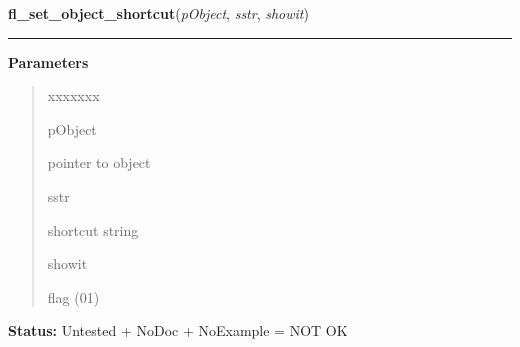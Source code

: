 \hspace{.8\funcindent}\begin{boxedminipage}{\funcwidth}

    \raggedright \textbf{fl\_set\_object\_shortcut}(\textit{pObject}, \textit{sstr}, \textit{showit})

    \vspace{-1.5ex}

    \rule{\textwidth}{0.5\fboxrule}
\setlength{\parskip}{2ex}
\setlength{\parskip}{1ex}
      \textbf{Parameters}
      \vspace{-1ex}

      \begin{quote}
        \begin{Ventry}{xxxxxxx}

          \item[pObject]

          pointer to object

          \item[sstr]

          shortcut string

          \item[showit]

          flag (0{\textbar}1)

        \end{Ventry}

      \end{quote}

\textbf{Status:} Untested + NoDoc + NoExample = NOT OK



    \end{boxedminipage}

    \label{xformslib:library:fl_set_object_shortcutkey}

    \vspace{0.5ex}

